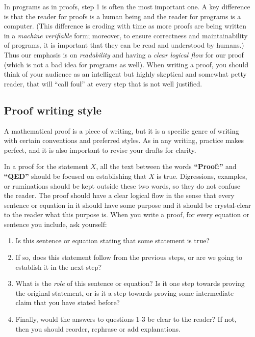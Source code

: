 In programs as in proofs, step 1 is often the most important one. A key
difference is that the reader for proofs is a human being and the reader
for programs is a computer. (This difference is eroding with time as
more proofs are being written in a \emph{machine verifiable} form;
moreover, to ensure correctness and maintainability of programs, it is
important that they can be read and understood by humans.) Thus our
emphasis is on \emph{readability} and having a \emph{clear logical flow}
for our proof (which is not a bad idea for programs as well). When
writing a proof, you should think of your audience as an intelligent but
highly skeptical and somewhat petty reader, that will ``call foul'' at
every step that is not well justified.

\subsection{Proof writing style}\label{Proof-writing-style}

A mathematical proof is a piece of writing, but it is a specific genre
of writing with certain conventions and preferred styles. As in any
writing, practice makes perfect, and it is also important to revise your
drafts for clarity.

In a proof for the statement \(X\), all the text between the words
\textbf{``Proof:''} and \textbf{``QED''} should be focused on
establishing that \(X\) is true. Digressions, examples, or ruminations
should be kept outside these two words, so they do not confuse the
reader. The proof should have a clear logical flow in the sense that
every sentence or equation in it should have some purpose and it should
be crystal-clear to the reader what this purpose is. When you write a
proof, for every equation or sentence you include, ask yourself:

\begin{enumerate}
\def\labelenumi{\arabic{enumi}.}
\item
  Is this sentence or equation stating that some statement is true?
\item
  If so, does this statement follow from the previous steps, or are we
  going to establish it in the next step?
\item
  What is the \emph{role} of this sentence or equation? Is it one step
  towards proving the original statement, or is it a step towards
  proving some intermediate claim that you have stated before?
\item
  Finally, would the answers to questions 1-3 be clear to the reader? If
  not, then you should reorder, rephrase or add explanations.
\end{enumerate}

